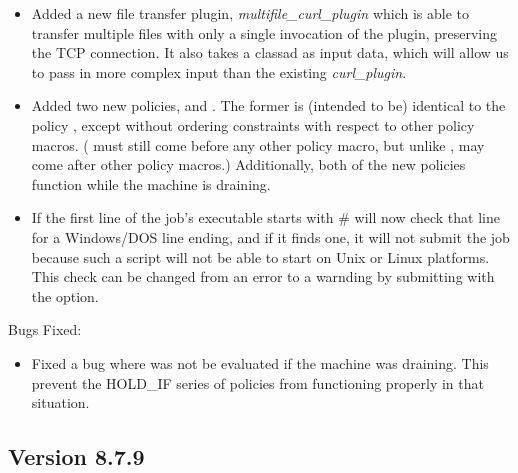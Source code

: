 \begin{itemize}

\item Added a new file transfer plugin, \emph{multifile\_curl\_plugin} which is
able to transfer multiple files with only a single invocation of the plugin, 
preserving the TCP connection. It also takes a classad as input data, which will 
allow us to pass in more complex input than the existing \emph{curl\_plugin}.

\item Added two new policies,  and
.  The former is (intended to be)
identical to the policy , except without
ordering constraints with respect to other policy macros.
( must still come before any other policy macro,
but unlike ,
 may come after other policy macros.)
Additionally, both of the new policies function while the machine is draining.

\item If the first line of the job's executable starts with \#\!
 will now check that line for a Windows/DOS line ending, and if it finds
one, it will not submit the job because such a script will not be able to start on Unix
or Linux platforms.  This check can be changed from an error to a warnding by submitting
with the  option.

\end{itemize}

\noindent Bugs Fixed:

\begin{itemize}

\item Fixed a bug where  was not be evaluated if the
machine was draining.  This prevent the HOLD\_IF series of policies from
functioning properly in that situation.

\end{itemize}

\subsection*{\label{sec:New-8-7-9}Version 8.7.9}

